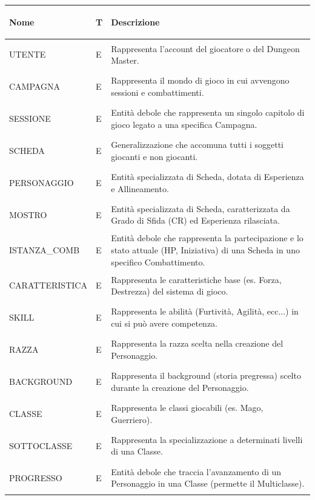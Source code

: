 \documentclass[a4paper,12pt]{report}
\begin{document}
\footnotesize
\begin{longtable}{@{} >{\bfseries\raggedright\arraybackslash}p{} >{\centering\arraybackslash}p{} >{\raggedright\arraybackslash}p{} @{}}
    \toprule    
    \textbf{Nome} & \textbf{T} & \textbf{Descrizione} \\     
    \midrule
    \endhead

    \endfoot

    \endlastfoot
    
    UTENTE & E & Rappresenta l'account del giocatore o del Dungeon Master. \\ \midrule
    CAMPAGNA & E & Rappresenta il mondo di gioco in cui avvengono sessioni e combattimenti. \\ \midrule 
    SESSIONE & E & Entità debole che rappresenta un singolo capitolo di gioco legato a una specifica Campagna. \\ \midrule 
    SCHEDA & E & Generalizzazione che accomuna tutti i soggetti giocanti e non giocanti. \\ \midrule 
    PERSONAGGIO & E & Entità specializzata di Scheda, dotata di Esperienza e Allineamento. \\ \midrule 
    MOSTRO & E & Entità specializzata di Scheda, caratterizzata da Grado di Sfida (CR) ed Esperienza rilasciata. \\ \midrule 
    ISTANZA\_COMB & E & Entità debole che rappresenta la partecipazione e lo stato attuale (HP, Iniziativa) di una Scheda in uno specifico Combattimento. \\ \midrule 
    CARATTERISTICA & E & Rappresenta le caratteristiche base (es. Forza, Destrezza) del sistema di gioco. \\ \midrule 
    SKILL & E & Rappresenta le abilità (Furtività, Agilità, ecc...) in cui si può avere competenza. \\ \midrule 
    RAZZA & E & Rappresenta la razza scelta nella creazione del Personaggio. \\ \midrule
    BACKGROUND & E & Rappresenta il background (storia pregressa) scelto durante la creazione del Personaggio. \\ \midrule
    CLASSE & E & Rappresenta le classi giocabili (es. Mago, Guerriero). \\ \midrule 
    SOTTOCLASSE & E & Rappresenta la specializzazione a determinati livelli di una Classe. \\ \midrule 
    PROGRESSO & E & Entità debole che traccia l'avanzamento di un Personaggio in una Classe (permette il Multiclasse). \\ \midrule 

\end{longtable}
\end{document}
